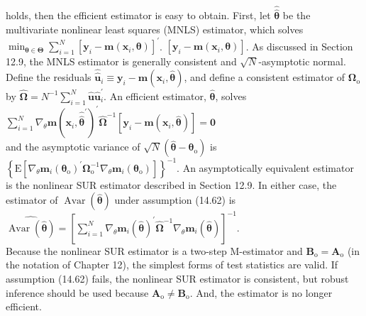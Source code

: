 \documentclass[10pt]{article}
\begin{document}
holds, then the efficient estimator is easy to obtain. First, let $\hat{\hat{\boldsymbol{\theta}}}$ be the multivariate nonlinear least squares (MNLS) estimator, which solves $\min _{\boldsymbol{\theta} \in \boldsymbol{\Theta}} \sum_{i=1}^{N}\left[\mathbf{y}_{i}-\mathbf{m}\left(\mathbf{x}_{i}, \boldsymbol{\theta}\right)\right]^{\prime}$. $\left[\mathbf{y}_{i}-\mathbf{m}\left(\mathbf{x}_{i}, \boldsymbol{\theta}\right)\right]$. As discussed in Section 12.9, the MNLS estimator is generally consistent and $\sqrt{N}$-asymptotic normal. Define the residuals $\hat{\hat{\mathbf{u}}}_{i} \equiv \mathbf{y}_{i}-\mathbf{m}\left(\mathbf{x}_{i}, \hat{\boldsymbol{\theta}}\right)$, and define a consistent estimator of $\boldsymbol{\Omega}_{\mathrm{o}}$ by $\hat{\boldsymbol{\Omega}}=N^{-1} \sum_{i=1}^{N} \hat{\mathbf{u}} \hat{\mathbf{u}}_{i}^{\prime}$. An efficient estimator, $\hat{\boldsymbol{\theta}}$, solves\\
$\sum_{i=1}^{N} \nabla_{\theta} \mathbf{m}\left(\mathbf{x}_{i}, \hat{\hat{\boldsymbol{\theta}}}^{\prime}\right)^{\prime} \hat{\boldsymbol{\Omega}}^{-1}\left[\mathbf{y}_{i}-\mathbf{m}\left(\mathbf{x}_{i}, \hat{\boldsymbol{\theta}}\right)\right]=\mathbf{0}$\\
and the asymptotic variance of $\sqrt{N}\left(\hat{\boldsymbol{\theta}}-\boldsymbol{\theta}_{\mathrm{o}}\right)$ is $\left\{\mathrm{E}\left[\nabla_{\theta} \mathbf{m}_{i}\left(\boldsymbol{\theta}_{\mathrm{o}}\right)^{\prime} \boldsymbol{\Omega}_{\mathrm{o}}^{-1} \nabla_{\theta} \mathbf{m}_{i}\left(\boldsymbol{\theta}_{\mathrm{o}}\right)\right]\right\}^{-1}$. An asymptotically equivalent estimator is the nonlinear SUR estimator described in Section 12.9. In either case, the estimator of $\operatorname{Avar}(\hat{\boldsymbol{\theta}})$ under assumption (14.62) is\\
$\widehat{\operatorname{Avar}(\hat{\boldsymbol{\theta}})}=\left[\sum_{i=1}^{N} \nabla_{\theta} \mathbf{m}_{i}(\hat{\boldsymbol{\theta}})^{\prime} \hat{\boldsymbol{\Omega}}^{-1} \nabla_{\theta} \mathbf{m}_{i}(\hat{\boldsymbol{\theta}})\right]^{-1}$.\\
Because the nonlinear SUR estimator is a two-step M-estimator and $\mathbf{B}_{\mathrm{o}}=\mathbf{A}_{\mathrm{o}}$ (in the notation of Chapter 12), the simplest forms of test statistics are valid. If assumption (14.62) fails, the nonlinear SUR estimator is consistent, but robust inference should be used because $\mathbf{A}_{\mathrm{o}} \neq \mathbf{B}_{\mathrm{o}}$. And, the estimator is no longer efficient.
\end{document}
